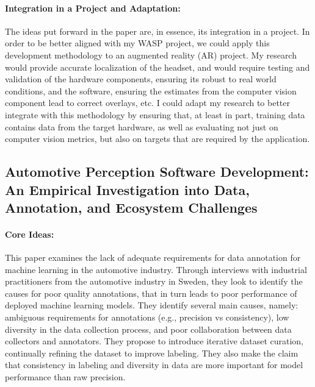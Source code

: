 \documentclass[11pt]{article}
\begin{document}
\paragraph{Integration in a Project and Adaptation:}
The ideas put forward in the paper are, in essence, its integration in a project.
In order to be better aligned with my WASP project, we could apply this development methodology to an augmented reality (AR) project.
My research would provide accurate localization of the headset, and would require testing and validation of the hardware components, ensuring its robust to real world conditions, and the software, ensuring the estimates from the computer vision component lead to correct overlays, etc.
I could adapt my research to better integrate with this methodology by ensuring that, at least in part, training data contains data from the target hardware, as well as evaluating not just on computer vision metrics, but also on targets that are required by the application.


\subsection{Automotive Perception Software Development: An
Empirical Investigation into Data, Annotation, and
Ecosystem Challenges \cite{heyn2023automotive}}

\paragraph{Core Ideas:}
This paper examines the lack of adequate requirements for data annotation for machine learning in the automotive industry.
Through interviews with industrial practitioners from the automotive industry in Sweden, they look to identify the causes for poor quality annotations, that in turn leads to poor performance of deployed machine learning models.
They identify several main causes, namely: ambiguous requirements for annotations (e.g., precision vs consistency), low diversity in the data collection process, and poor collaboration between data collectors and annotators.
They propose to introduce iterative dataset curation, continually refining the dataset to improve labeling.
They also make the claim that consistency in labeling and diversity in data are more important for model performance than raw precision.
\end{document}
